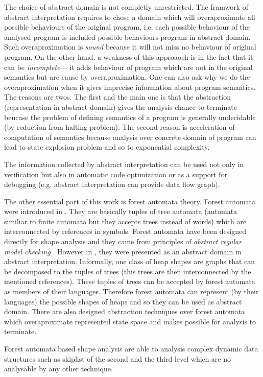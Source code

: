 \documentclass[a4paper, 12pt]{article}
\begin{document}
The choice of abstract domain is not completly unrestricted.
The framwork of abstract interpretation requires to chose a domain
which will overaproximate all possible behaviours of the original program,
i.e. each possible behaviour of the analysed program is included possible
behaviours program in abstract domain.
Such overaproximation is \emph{sound} because it will not miss no
behaviour of original program.
On the other hand, a weakness of this approaoch is in the fact that it can
be \emph{incomplete}\,---\,it adds behaviour of program which are not in the original
semantics but are cause by overaproximation.
One can also ask why we do the overaproximation when it gives imprecise information about
program semantics.
The reasons are twos.
The first and the main one is that the abstraction (representation in abstract domain) gives
the analysis chance to terminate beucase the problem of defining semantics of a program is
generally undecidable (by reduction from halting problem).
The second reason is acceleration of computation of semantics because analysis over concrete
domain of program can lead to state explosion problem and so to exponential complexity.

The information collected by abstract interpretation can be used not only
in verification but also in automatic code optimization or as a support for debugging
(e.g. abstract interpretation can provide data flow graph).

The other essential part of this work is forest automata theory.
Forest automata were introduced in \cite{cav11}.
They are basically tuples of tree automata (automata similiar to finite automata
but they accepts trees instead of words) which are interconnected
by references in symbols.
Forest automata have been designed directly for shape analysis and
they came from principles of \emph{abstract regular model checking} \cite{artmc}.
However in \cite{atva13}, they were presented as an abstract domain in abstract interpretation.
Informally, one class of heap shapes are graphs that can be decomposed to the tuples
of trees (this trees are then interconnected by the mentioned references).
These tuples of trees can be accepted by forest automata as members of their languages.
Therefore forest automata can represent (by their languages) the possible shapes of heaps
and so they can be used as abstract domain.
There are also designed abstraction techniques over forest automata which
overaproximate represented state space and makes possible for analysis to terminate.

Forest automata based shape analysis are able to analysis complex
dynamic data structures such as skiplist of the second and the third
level which are no analysable by any other technique.
\end{document}

